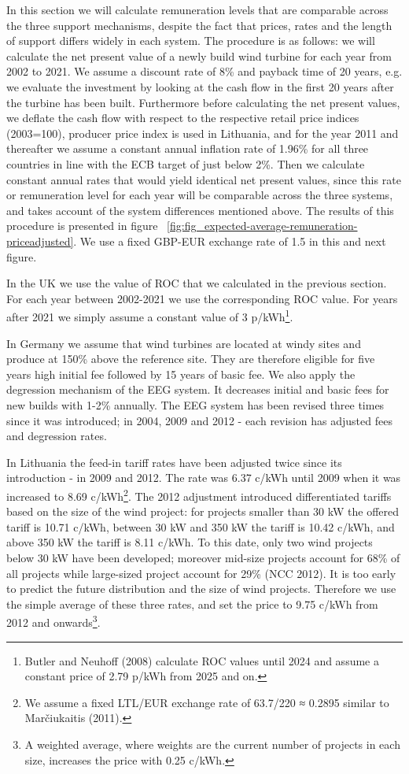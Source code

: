 \documentclass[a4paper, 12pt]{article}
\begin{document}
In this section we will calculate remuneration levels that are comparable across the three support mechanisms, despite the fact that prices, rates and the length of support differs widely in each system. The procedure is as follows: we will calculate the net present value of a newly build wind turbine for each year from 2002 to 2021. We assume a discount rate of 8\% and payback time of 20 years, e.g. we evaluate the investment by looking at the cash flow in the first 20 years after the turbine has been built. Furthermore before calculating the net present values, we deflate the cash flow with respect to the respective retail price indices (2003=100), producer price index is used in Lithuania, and for the year 2011 and thereafter we assume a constant annual inflation rate of 1.96\% for all three countries in line with the ECB target of just below 2\%. Then we calculate constant annual rates that would yield identical net present values, since this rate or remuneration level for each year will be comparable across the three systems, and takes account of the system differences mentioned above. The results of this procedure is presented in figure ~\ref{fig:fig_expected-average-remuneration-priceadjusted}. We use a fixed GBP-EUR exchange rate of 1.5 in this and next figure.

In the UK we use the value of ROC that we calculated in the previous section. For each year between 2002-2021 we use the corresponding ROC value. For years after 2021 we simply assume a constant value of 3 p/kWh\footnote{Butler and Neuhoff (2008) calculate ROC values until 2024 and assume a constant price of 2.79 p/kWh from 2025 and on.}.

In Germany we assume that wind turbines are located at windy sites and produce at 150\% above the reference site. They are therefore eligible for five years high initial fee followed by 15 years of basic fee. We also apply the degression mechanism of the EEG system. It decreases initial and basic fees for new builds with 1-2\% annually. The EEG system has been revised three times since it was introduced; in 2004, 2009 and 2012 - each revision has adjusted fees and degression rates.

In Lithuania the feed-in tariff rates have been adjusted twice since its introduction - in 2009 and 2012. The rate was 6.37 c/kWh until 2009 when it was increased to 8.69 c/kWh\footnote{We assume a fixed LTL/EUR exchange rate of 63.7/220 ≈ 0.2895 similar to Marčiukaitis (2011).}. The 2012 adjustment introduced differentiated tariffs based on the size of the wind project: for projects smaller than 30 kW the offered tariff is 10.71 c/kWh, between 30 kW and 350 kW the tariff is 10.42 c/kWh, and above 350 kW the tariff is 8.11 c/kWh. To this date, only two wind projects below 30 kW have been developed; moreover mid-size projects account for 68\% of all projects while large-sized project account for 29\% (NCC 2012). It is too early to predict the future distribution and the size of wind projects. Therefore we use the simple average of these three rates, and set the price to 9.75 c/kWh from 2012 and onwards\footnote{A weighted average, where weights are the current number of projects in each size, increases the price with 0.25 c/kWh.}. 
\end{document}
